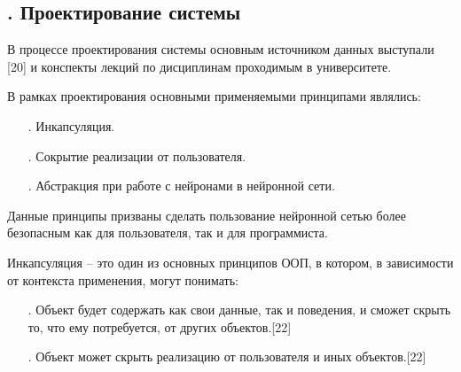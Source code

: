 \subtitlespace

\subsection*{
	\gostTitleFont
	\redline
	\thechaptercntr .\thesubchaptercntr \spc
	Проектирование системы 
} \addtocounter{subchaptercntr}{1}

\subtitlespace

{\gostFont

\par \redline В процессе проектирования системы основным источником данных выступали [20] и конспекты лекций по дисциплинам проходимым в университете. 

\par \redline В рамках проектирования основными применяемыми принципами являлись:

 \begin{itemize}[leftmargin=2.15cm, labelwidth=0.65cm, labelsep=0.0cm] 
 	
 	\item[\theitemcntr. ] Инкапсуляция.
 	\addtocounter{itemcntr}{1}
 	
 	\item[\theitemcntr. ] Сокрытие реализации от пользователя.
 	\addtocounter{itemcntr}{1}
 	
 	\item[\theitemcntr. ] Абстракция при работе с нейронами в нейронной сети.
 	\addtocounter{itemcntr}{1}
 	
 	\setcounter{itemcntr}{1}
 \end{itemize}

\par \redline Данные принципы призваны сделать пользование нейронной сетью более безопасным как для пользователя, так и для программиста.

\par \redline Инкапсуляция {--} это один из основных принципов ООП, в котором, в зависимости от контекста применения, могут понимать:

\begin{itemize}[leftmargin=2.15cm, labelwidth=0.65cm, labelsep=0.0cm] 
	
	\item[\theitemcntr. ]  Объект будет содержать как свои данные, так и поведения, и сможет скрыть то, что ему потребуется, от других объектов.[22]
	\addtocounter{itemcntr}{1}
	
	\item[\theitemcntr. ] Объект может скрыть реализацию от пользователя и иных объектов.[22]
	\addtocounter{itemcntr}{1}
	

\end{itemize}}
